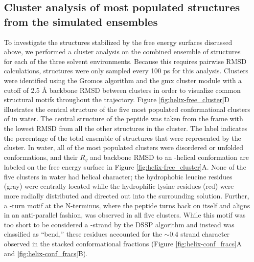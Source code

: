 \subsection{Cluster analysis of most populated structures from the simulated ensembles}

To investigate the structures stabilized by the free energy surfaces discussed above, we performed a cluster analysis on the combined ensemble of structures for each of the three solvent environments. 
Because this requires pairwise RMSD calculations, structures were only sampled every 100 ps for this analysis. 
Clusters were identified using the Gromos algorithm\cite{Daura1999} and the gmx cluster module with a cutoff of 2.5 \si{\angstrom} backbone RMSD between clusters in order to visualize common structural motifs throughout the trajectory. 
Figure \ref{fig:helix-free_cluster}D illustrates the central structure of the five most populated conformational clusters of \pep{} in water. 
The central structure of the peptide was taken from the frame with the lowest RMSD from all the other structures in the cluster. 
The label indicates the percentage of the total ensemble of structures that were represented by the cluster. 
In water, all of the most populated clusters were disordered or unfolded conformations, and their $R_g$ and backbone RMSD to an \textalpha{}-helical conformation are labeled on the free energy surface in Figure \ref{fig:helix-free_cluster}A. 
None of the five clusters in water had helical character; 
the hydrophobic leucine residues (gray) were centrally located while the hydrophilic lysine residues (red) were more radially distributed and directed out into the surrounding solution. 
Further, a \textbeta{}-turn motif at the N-terminus, where the peptide turns back on itself and aligns in an anti-parallel fashion, was observed in all five clusters. 
While this motif was too short to be considered a \textbeta{}-strand by the DSSP algorithm and instead was classified as ``bend,'' these residues accounted for the $\sim$0.4 strand character observed in the stacked conformational fractions (Figure \ref{fig:helix-conf_fracs}A and \ref{fig:helix-conf_fracs}B).

